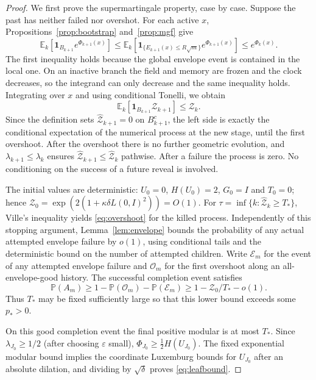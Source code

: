 \documentclass[11pt]{article}
\theoremstyle{definition}
\theoremstyle{remark}
\numberwithin{equation}{section}
\newcommand{\E}{\mathbb E}
\newcommand{\one}{\mathbf 1}
\begin{document}
\begin{proof}
We first prove the supermartingale property, case by case.
Suppose the past has neither failed nor overshot. For each active
$x$, Propositions~\ref{prop:bootstrap} and~\ref{prop:mgf} give
\[
 \E_k\left[\one_{B_{k+1}}e^{\Phi_{k+1}(x)}\right]
 \le\E_k\left[\one_{\{E_{k+1}(x)\le R\sqrt m\}}
                    e^{\Phi_{k+1}(x)}\right]
 \le e^{\Phi_k(x)}.
\]
The first inequality holds because the global envelope event is
contained in the local one. On an inactive branch the
field and memory are frozen and the clock decreases, so the
integrand can only decrease and the same inequality holds.
Integrating over $x$ and using conditional Tonelli, we obtain
\[
 \E_k[\one_{B_{k+1}}\mathcal Z_{k+1}]\le\mathcal Z_k.
\]
Since the definition sets $\widehat{\mathcal Z}_{k+1}=0$ on
$B_{k+1}^c$, the left side is exactly the conditional expectation of
the numerical process at the new stage, until the first overshoot.
After the overshoot there is no further geometric evolution, and
$\lambda_{k+1}\le\lambda_k$ ensures
$\widehat{\mathcal Z}_{k+1}\le
\widehat{\mathcal Z}_k$ pathwise. After a failure the process is
zero. No conditioning on the success of a future reveal is involved.

The initial values are deterministic:
$U_0=0$, $H(U_0)=2$, $G_0=I$ and $T_0=0$; hence
$\mathcal Z_0=\exp(2(1+\kappa\delta L(0,I)^2))=O(1)$.
For $\tau=\inf\{k:\widehat{\mathcal Z}_k\ge T_*\}$,
Ville's inequality yields \eqref{eq:overshoot} for the killed
process. Independently of this stopping argument,
Lemma~\ref{lem:envelope} bounds the probability of any actual
attempted envelope failure by $o(1)$, using conditional tails and the
deterministic bound on the number of attempted children. Write
$\mathcal E_m$ for the event of any attempted envelope
failure and $\mathcal O_m$ for the first overshoot along an
all-envelope-good history. The successful completion event satisfies
\[
 \mathbb P(A_m)\ge1-\mathbb P(\mathcal O_m)
                   -\mathbb P(\mathcal E_m)
 \ge1-\mathcal Z_0/T_*-o(1).
\]
Thus $T_*$ may be fixed sufficiently large so that this lower
bound exceeds some $p_*>0$.

On this good completion event the final positive modular is at
most $T_*$. Since $\lambda_{J_0}\ge1/2$ (after choosing
$\varepsilon$ small), $\Phi_{J_0}\ge\frac12 H(U_{J_0})$.
The fixed exponential modular bound implies the coordinate
Luxemburg bounds for $U_{J_0}$ after an absolute dilation, and
dividing by $\sqrt\delta$ proves \eqref{eq:leafbound}.
\end{proof}
\end{document}
